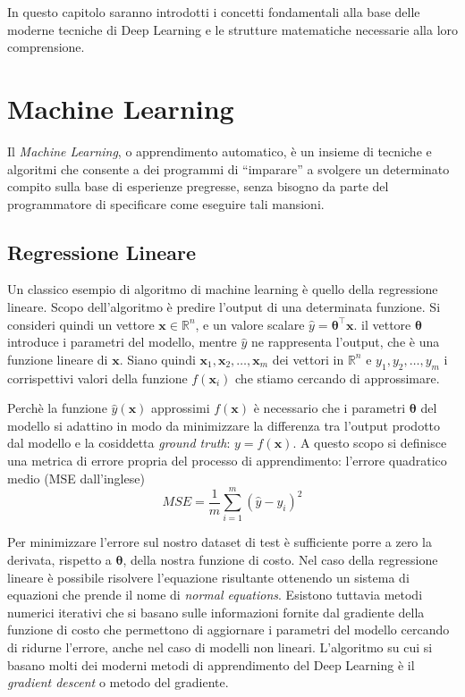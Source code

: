 \documentclass{standalone}
\begin{document}
In questo capitolo saranno introdotti i concetti fondamentali alla base delle
moderne tecniche di Deep Learning e le strutture matematiche necessarie alla
loro comprensione. \\

\section{Machine Learning}
Il \emph{Machine Learning}, o apprendimento automatico, è un insieme di
tecniche e algoritmi che consente a dei programmi di ``imparare'' a svolgere
un determinato compito sulla base di esperienze pregresse, senza bisogno da
parte del programmatore di specificare come eseguire tali mansioni. 
\subsection{Regressione Lineare}
Un classico esempio di algoritmo di machine learning è quello della regressione
lineare. Scopo dell'algoritmo è predire l'output di una determinata funzione.
Si consideri quindi un vettore $ \bm x \in \mathbb{R}^n $, e un valore scalare
$\hat{y} = \bm \theta^\intercal \bm x$. il vettore $\bm \theta$ introduce i
parametri del modello, mentre $\hat{y}$ ne rappresenta l'output, che è una
funzione lineare di $\bm x$. Siano quindi $ \bm x_1, \bm x_2, \dotsc, \bm x_m $
dei vettori in $\mathbb{R}^n$ e  $ y_1, y_2, \dotsc, y_m $ i corrispettivi
valori della funzione $f(\bm x_i)$ che stiamo cercando di approssimare.

Perchè la funzione $\hat{y}(\bm x)$ approssimi $f(\bm x)$ è necessario che i
parametri $\bm \theta$ del modello si adattino in modo da minimizzare la differenza
tra l'output prodotto dal modello e la cosiddetta \emph{ground truth}: $y =
f(\bm x)$. A questo scopo si definisce una metrica di errore propria del
processo di apprendimento: l'errore quadratico medio (MSE dall'inglese) 
\begin{equation} \label{eq:mse}
  MSE = \frac{1}{m} \sum_{i=1}^m{(\hat{y} - y_i)^2} 
\end{equation}

Per minimizzare l'errore sul nostro dataset di test è sufficiente porre a zero
la derivata, rispetto a $\bm \theta$, della nostra funzione di costo. Nel caso
della regressione lineare è possibile risolvere l'equazione risultante
ottenendo un sistema di equazioni che prende il nome di 
\emph{normal equations}.
Esistono tuttavia metodi numerici iterativi che si basano sulle informazioni
fornite dal gradiente della funzione di costo che permettono di aggiornare i
parametri del modello cercando di ridurne l'errore, anche nel caso di modelli
non lineari. L'algoritmo su cui si basano molti dei moderni metodi di
apprendimento del Deep Learning è il \emph{gradient descent} o metodo del
gradiente.
\end{document}
